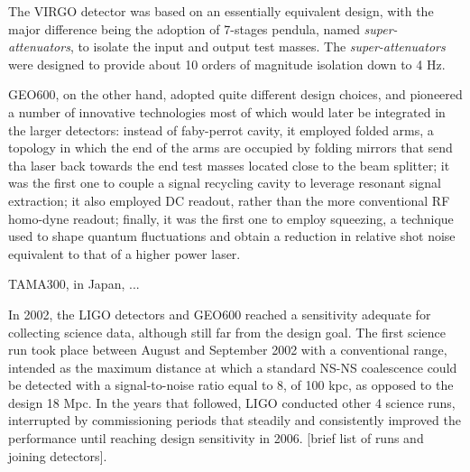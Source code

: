 The VIRGO detector was based on an essentially equivalent design, with the major difference being the adoption of 7-stages pendula, named \textit{super-attenuators}, to isolate the input and output test masses. The \textit{super-attenuators} were designed to provide about 10 orders of magnitude isolation down to 4 Hz.

GEO600, on the other hand, adopted quite different design choices, and pioneered a number of innovative technologies most of which would later be integrated in the larger detectors: instead of faby-perrot cavity, it employed folded arms, a topology in which the end of the arms are occupied by folding mirrors that send tha laser back towards the end test masses located close to the beam splitter; it was the first one to couple a signal recycling cavity to leverage resonant signal extraction; it also employed DC readout, rather than the more conventional RF homo-dyne readout; finally, it was the first one to employ squeezing, a technique used to shape quantum fluctuations and obtain a reduction in relative shot noise equivalent to that of a higher power laser.

TAMA300, in Japan, ...

In 2002, the LIGO detectors and GEO600 reached a sensitivity adequate for collecting science data, although still far from the design goal. 
The first science run took place between August and September 2002 with a conventional range, intended as the maximum distance at which a standard NS-NS coalescence could be detected with a signal-to-noise ratio equal to 8, of 100 kpc, as opposed to the design 18 Mpc. In the years that followed, LIGO conducted other 4 science runs, interrupted by commissioning periods that steadily and consistently improved the performance until reaching design sensitivity in 2006. [brief list of runs and joining detectors].

 

